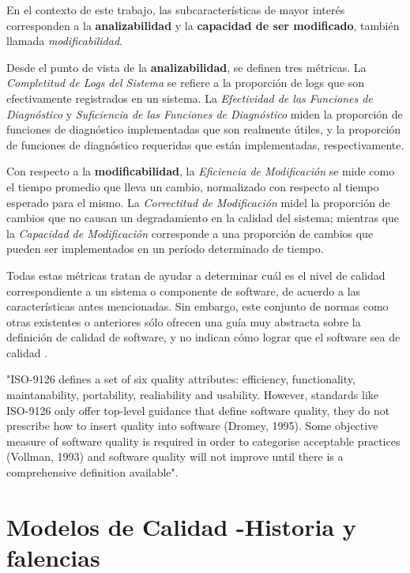 En el contexto de este trabajo, las subcaracterísticas de mayor interés corresponden
a la \textbf{analizabilidad} y la \textbf{capacidad de ser modificado}, también llamada
\textit{modificabilidad}.

Desde el punto de vista de la \textbf{analizabilidad}, se definen tres métricas.
La \textit{Completitud de Logs del Sistema} se refiere a la proporción de logs que son
efectivamente registrados en un sistema.
La \textit{Efectividad de las Funciones de Diagnóstico} y \textit{Suficiencia de las
Funciones de Diagnóstico} miden la proporción de funciones de diagnóstico implementadas que
son realmente útiles, y la proporción de funciones de diagnóstico requeridas que están
implementadas, respectivamente.

Con respecto a la \textbf{modificabilidad}, la \textit{Eficiencia de Modificación} se mide
como el tiempo promedio que lleva un cambio, normalizado con respecto al tiempo esperado
para el mismo.
La \textit{Correctitud de Modificación} midel la proporción de cambios que no causan un
degradamiento en la calidad del sistema; mientras que la \textit{Capacidad de Modificación}
corresponde a una proporción de cambios que pueden ser implementados en un período determinado
de tiempo.

Todas estas métricas tratan de ayudar a determinar cuál es el nivel de calidad correspondiente a
un sistema o componente de software, de acuerdo a las características antes mencionadas.
Sin embargo, este conjunto de normas como otras existentes o anteriores sólo ofrecen una
guía muy abstracta sobre la definición de calidad de software, y no indican cómo lograr
que el software sea de calidad \cite{Relf04}.

"ISO-9126 defines a set of six quality attributes: efficiency, functionality, maintanability,
portability, realiability and usability.
However, standards like ISO-9126 only offer top-level guidance that define software quality,
they do not prescribe how to insert quality into software (Dromey, 1995).
Some objective measure of software quality is required in order to categorise acceptable
practices (Vollman, 1993) and software quality will not improve until there is a comprehensive
definition available"\cite{Relf04}.

\section{Modelos de Calidad -Historia y falencias}


